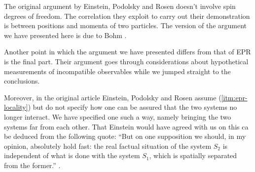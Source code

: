 \begin{observation}
  The original argument by Einstein, Podolsky and Rosen \cite{PhysRev.47.777} doesn't involve spin degrees of freedom. The correlation they exploit to carry out their demonstration is between positions and momenta of two particles. The version of the argument we have presented here is due to Bohm \cite{bohm1951quantum}.

  Another point in which the argument we have presented differs from that of EPR is the final part. Their argument goes through considerations about hypothetical measurements of incompatible observables while we jumped straight to the conclusions.

  Moreover, in the original article Einstein, Podolsky and Rosen assume (\ref{itm:epr-locality}) but do not specify how one can be assured that the two systems no longer interact. We have specified one such a way, namely bringing the two systems far from each other. That Einstein would have agreed with us on this ca be deduced from the following quote: ``But on one supposition we should, in my opinion, absolutely hold fast: the real factual situation of the system $S_2$ is independent of what is done with the system $S_1$, which is spatially separated from the former.'' \cite{schilpp1949albert}.%
\end{observation}
